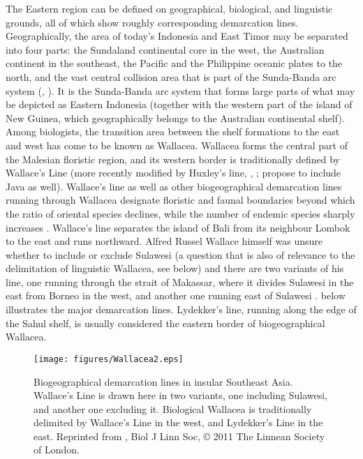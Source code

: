 The Eastern  region can be defined on geographical, biological, and linguistic grounds, all of which show roughly corresponding demarcation lines. Geographically, the area of today's Indonesia and East Timor may be separated into four parts: the Sundaland continental core in the west, the Australian continent in the southeast, the Pacific and the Philippine oceanic plates to the north, and the vast central collision area that is part of the Sunda-Banda arc system (\citealt{Bellwood2007}, \citealt{Hall2009}). It is the Sunda-Banda arc system that forms large parts of what may be depicted as Eastern Indonesia (together with the western part of the island of New Guinea, which geographically belongs to the Australian continental shelf). Among biologists, the transition area between the shelf formations to the east and west has come to be known as Wallacea. Wallacea forms the central part of the Malesian floristic region, and its western border is traditionally defined by Wallace's Line (more recently modified by Huxley's line, \citealt{Bellwood2007}, \citealt{Raes2009}; \citealt{Welzen2011} propose to include Java as well). Wallace's line as well as other biogeographical demarcation lines running through Wallacea designate floristic and faunal boundaries beyond which the ratio of oriental species declines, while the number of endemic species sharply increases \citep{Bellwood2007}. Wallace's line separates the island of Bali from its neighbour Lombok to the east and runs northward. Alfred Russel Wallace himself was unsure whether to include or exclude Sulawesi (a question that is also of relevance to the delimitation of linguistic Wallacea, see below) and there are two variants of his line, one running through the strait of Makassar, where it divides Sulawesi in the east from Borneo in the west, and another one running east of Sulawesi \citep{Welzen2011}.  below illustrates the major demarcation lines. Lydekker's line, running along the edge of the Sahul shelf, is usually considered the eastern border of biogeographical Wallacea.

\begin{figure}

\texttt{[image: figures/Wallacea2.eps]}
\caption[Biogeographical demarcation lines in insular Southeast Asia]{Biogeographical demarcation lines in insular Southeast Asia. Wallace's Line is drawn here in two variants, one including Sulawesi, and another one excluding it. Biological Wallacea is traditionally delimited by Wallace's Line in the west, and Lydekker's Line in the east. Reprinted from \citealt{Welzen2011}, Biol J Linn Soc, © 2011 The Linnean Society of London.}\label{map:wallacea}

\end{figure}

